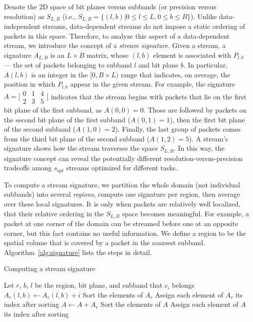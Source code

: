 Denote the 2D space of bit planes versus subbands (or precision versus resolution) as $S_{L,B}$
(i.e., $S_{L,B}=\{(l,b) | 0\leq l\leq L, 0\leq b\leq B\}$). Unlike data-independent streams,
data-dependent streams do not impose a static ordering of packets in this space. Therefore, to
analyze this aspect of a data-dependent stream, we introduce the concept of a \emph{stream
signature}. Given a stream, a signature $A_{L,B}$ is an $L \times B$ matrix, whose $(l,b)$ element
is associated with $P_{l,b}$ --- the set of packets belonging to subband $l$ and bit plane $b$. In
particular, $A(l,b)$ is an integer in the $[0, B\times L)$ range that indicates, on average, the
position in which $P_{l,b}$ appear in the given stream. For example, the signature $A=\bigl[
\begin{smallmatrix}0 & 1 & 4\\ 2 & 3 & 5\end{smallmatrix}\bigr]$ indicates that the stream begins
with packets that lie on the first bit plane of the first subband, as $A(0,0)=0$. Those are followed
by packets on the second bit plane of the first subband ($A(0,1)=1$), then the first bit plane of
the second subband ($A(1,0)=2$). Finally, the last group of packets comes from the third bit plane
of the second subband ($A(1,2)=5$). A stream's signature shows how the stream traverses the space
$S_{L,B}$. In this way, the signature concept can reveal the potentially different
resolution-versus-precision tradeoffs among $s_{opt}$ streams optimized for different tasks.

To compute a stream signature, we partition the whole domain (not individual subbands) into several
\emph{regions}, compute one signature per region, then average over these local signatures. It is
only when packets are relatively well localized, that their relative ordering in the $S_{L,B}$ space
becomes meaningful. For example, a packet at one corner of the domain can be streamed before one at
an opposite corner, but this fact contains no useful information. We define a region to be the
spatial volume that is covered by a packet in the coarsest subband. Algorithm~\ref{alg:signature}
lists the steps in detail.

\begin{algorithm}[h]
  \small
  \caption{Computing a stream signature}
  \begin{algorithmic}[1]
			\State Let $r$, $b$, $l$ be the region, bit plane, and subband that $c_i$ belongs
			\State $A_r(l,b) \gets A_r(l,b)+i$
		\EndFor
			\State Sort the elements of $A_r$
			\State Assign each element of $A_r$ its index after sorting
			\State $A \gets A+A_r$
		\EndFor
		\State Sort the elements of $A$
		\State Assign each element of $A$ its index after sorting
	\end{algorithmic}
	\label{alg:signature}
\end{algorithm}

